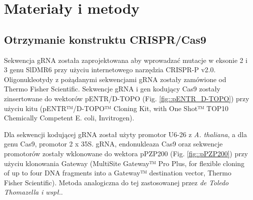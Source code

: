 \documentclass[two column, twoside, a4paper]{article}
\begin{document}
\section{Materiały i metody}

\subsection{Otrzymanie konstruktu CRISPR/Cas9}

Sekwencja gRNA została zaprojektowana aby wprowadzać mutacje w eksonie 2 i 3 genu SlDMR6 przy użyciu internetowego narzędzia CRISPR-P v2.0\autocite{Lei2014}. Oligonukleotydy z pożądanymi sekwencjami gRNA zostały zamówione od \textsf{Thermo Fisher Scientific}. Sekwencje gRNA i gen kodujący Cas9 zostały zinsertowane do wektorów pENTR\texttrademark/D-TOPO (Fig. \ref{fig::pENTR_D-TOPO}) przy użyciu kitu (pENTR™/D-TOPO™ Cloning Kit, with One Shot™ TOP10 Chemically Competent E. coli, \textsf{Invitrogen\texttrademark}).

Dla sekwencji kodującej gRNA został użyty promotor U6-26 z \textit{A. thaliana}, a dla genu Cas9, promotor 2 x 35S. gRNA, endonukleaza Cas9 oraz sekwencje promotorów zostały wklonowane do wektora pPZP200 (Fig. \ref{fig::pPZP200}) przy użyciu klonowania Gateway (MultiSite Gateway™ Pro Plus, for flexible cloning of up to four DNA fragments into a Gateway™ destination vector, \textsf{Thermo Fisher Scientific}). Metoda analogiczna do tej zastosowanej przez \textit{de Toledo Thomazella i wspł.}\autocite{deToledoThomazella2016}.
\end{document}

